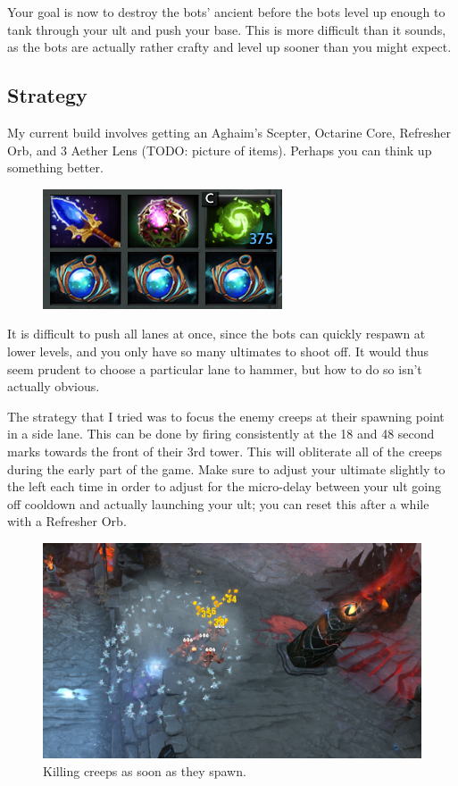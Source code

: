 \documentclass{article}
\begin{document}
Your goal is now to destroy the bots' ancient before the bots level up enough to tank through your ult and push your base.  This is more difficult than it sounds, as the bots are actually rather crafty and level up sooner than you might expect.

\subsection*{Strategy}
My current build involves getting an Aghaim's Scepter, Octarine Core, Refresher Orb, and 3 Aether Lens (TODO: picture of items).  Perhaps you can think up something better.
\begin{figure}
\includegraphics{files/blog/2017_07_17_ancient_apparition_bowling/items.png}
\end{figure}

It is difficult to push all lanes at once, since the bots can quickly respawn at lower levels, and you only have so many ultimates to shoot off.  It would thus seem prudent to choose a particular lane to hammer, but how to do so isn't actually obvious.

The strategy that I tried was to focus the enemy creeps at their spawning point in a side lane.  This can be done by firing consistently at the 18 and 48 second marks towards the front of their 3rd tower. This will obliterate all of the creeps during the early part of the game.  Make sure to adjust your ultimate slightly to the left each time in order to adjust for the micro-delay between your ult going off cooldown and actually launching your ult; you can reset this after a while with a Refresher Orb.
\begin{figure}
\includegraphics[scale=0.33]{files/blog/2017_07_17_ancient_apparition_bowling/towerhit.png}
\caption{Killing creeps as soon as they spawn.}
\end{figure}
\end{document}
